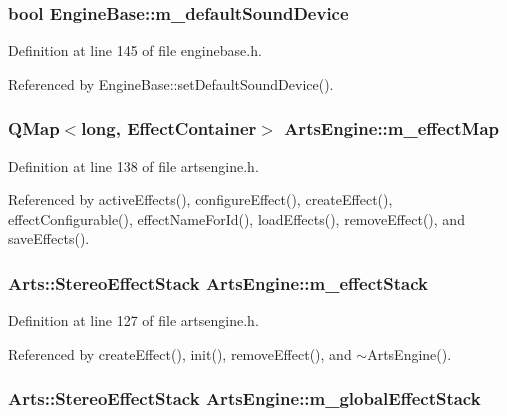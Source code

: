 \subsubsection{\setlength{\rightskip}{0pt plus 5cm}bool {\bf Engine\-Base::m\_\-default\-Sound\-Device}\hspace{0.3cm}{\tt  [protected, inherited]}}\label{classEngineBase_EngineBasep6}




Definition at line 145 of file enginebase.h.

Referenced by Engine\-Base::set\-Default\-Sound\-Device().
\subsubsection{\setlength{\rightskip}{0pt plus 5cm}QMap$<$long, {\bf Effect\-Container}$>$ {\bf Arts\-Engine::m\_\-effect\-Map}\hspace{0.3cm}{\tt  [private]}}\label{classArtsEngine_ArtsEnginer13}




Definition at line 138 of file artsengine.h.

Referenced by active\-Effects(), configure\-Effect(), create\-Effect(), effect\-Configurable(), effect\-Name\-For\-Id(), load\-Effects(), remove\-Effect(), and save\-Effects().
\subsubsection{\setlength{\rightskip}{0pt plus 5cm}Arts::Stereo\-Effect\-Stack {\bf Arts\-Engine::m\_\-effect\-Stack}\hspace{0.3cm}{\tt  [private]}}\label{classArtsEngine_ArtsEnginer5}




Definition at line 127 of file artsengine.h.

Referenced by create\-Effect(), init(), remove\-Effect(), and $\sim$Arts\-Engine().
\subsubsection{\setlength{\rightskip}{0pt plus 5cm}Arts::Stereo\-Effect\-Stack {\bf Arts\-Engine::m\_\-global\-Effect\-Stack}\hspace{0.3cm}{\tt  [private]}}\label{classArtsEngine_ArtsEnginer4}




